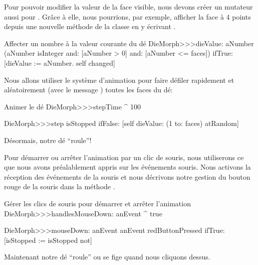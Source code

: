 \documentclass[a4paper,10pt,twoside]{book}
\begin{document}
Pour pouvoir modifier la valeur de la face visible, nous devons
cr\'eer un mutateur aussi pour . 
Gr\^ace \`a elle, nous pourrions, par exemple, afficher la face \`a 4
points depuis une nouvelle m\'ethode de la classe en y \'ecrivant
.

\begin{method}{Affecter un nombre \`a la valeur courante du d\'e}
DieMorph>>>dieValue: aNumber
	(aNumber isInteger
			and: [aNumber > 0]
			and: [aNumber <= faces])
		ifTrue:
			[dieValue := aNumber.
			self changed]
\end{method}

Nous allons utiliser le syst\`eme d'animation pour faire d\'efiler rapidement 
et al\'eatoirement (avec le message ) toutes les faces du d\'e:
\begin{methods}{Animer le d\'e}
DieMorph>>>stepTime
	^ 100

DieMorph>>>step
	isStopped ifFalse: [self dieValue: (1 to: faces) atRandom]
\end{methods}
D\'esormais, notre d\'e ``roule''!

Pour d\'emarrer ou arr\^eter  l'animation par un clic de souris, nous
utiliserons ce que nous avons pr\'ealablement appris sur les
\'ev\'enements souris.
Nous activons la r\'eception des \'ev\'enements de la souris et nous
d\'ecrivons notre gestion du bouton rouge de la souris dans la
m\'ethode .       

\begin{methods}{G\'erer les clics de souris pour d\'emarrer et arr\^eter l'animation}
DieMorph>>>handlesMouseDown: anEvent
	^ true

DieMorph>>>mouseDown: anEvent
	anEvent redButtonPressed
		ifTrue: [isStopped := isStopped not]
\end{methods}

Maintenant notre d\'e ``roule'' ou se fige quand nous cliquons dessus.



\end{document}
